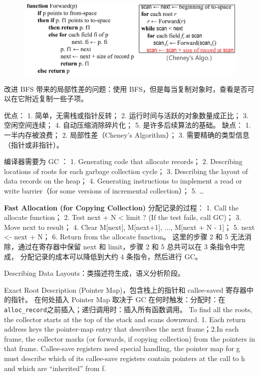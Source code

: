 \begin{figure}[H]
    \centering
    \includegraphics[width=0.8\linewidth]{figures/gc2.png}
\end{figure}

\par \noindent 改进 BFS 带来的局部性差的问题：使用 BFS，但是每当复制对象时，查看是否可以在它附近复制一些子项。

\par \noindent 优点：
1. 简单，无需栈或指针反转；
2. 运行时间与活跃的对象数量成正比；
3. 空闲空间连续；
4. 自动压缩消除碎片化；
5. 是许多后续算法的基础。
缺点：
1. 一半内存被浪费；
2. 局部性差（Cheney’s Algorithm）；
3. 需要精确的类型信息（指针或非指针）。

\par \noindent 编译器需要为 GC ：
1. Generating code that allocate records；
2. Describing locations of roots for each garbage collection cycle；
3. Describing the layout of data records on the heap；
4. Generating instructions to implement a read or write barrier（for some versions of incremental collection）；
5. \dots

\par \noindent \textbf{Fast Allocation (for Copying Collection)} 
分配记录的过程：
1. Call the allocate function；
2. Test next + N < limit ? (If the test fails, call GC)；
3. Move next to result；
4. Clear M[next], M[next+1], ..., M[next + N - 1]；
5. next <- next + N；
6. Return from the allocate function。
这里的步骤 2 和 5 无法消除，通过在寄存器中保留 next 和 limit，步骤 2 和 5 总共可以在 3 条指令中完成，
分配记录的成本可以降低到大约 4 条指令，然后进行 GC。

\par \noindent Describing Data Layouts：类描述符生成，语义分析阶段。

\par \noindent Exact Root Description (Pointer Map)，包含栈上的指针和 callee-saved 寄存器中的指针。
在何处插入 Pointer Map 取决于 GC 在何时触发：分配时：在 \texttt{alloc\_record}之前插入；递归调用时：插入所有函数调用。
To find all the roots, the collector starts at the top of the stack and scans downward.
1. Each return address keys the pointer-map entry that
describes the next frame；2.In each frame, the collector marks (or forwards, if copying collection) from the pointers in that frame.
Callee-save registers need special handling, the pointer map for g must describe 
which of its callee-save registers contain pointers at the call to h and which are “inherited” from f.

